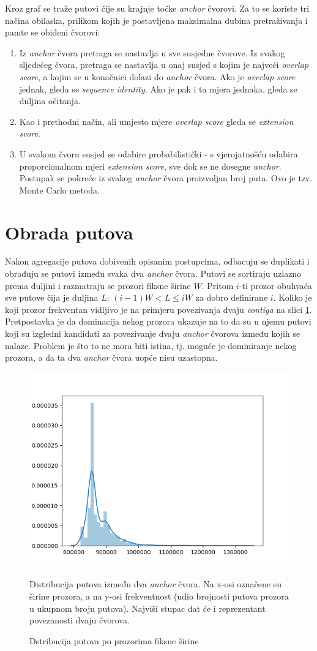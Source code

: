 \documentclass[times, utf8, seminar, numeric]{fer}
\begin{document}
\noindent
Kroz graf se traže putovi čije su krajnje točke \textit{anchor} čvorovi. Za to se koriste tri načina obilaska, prilikom kojih je postavljena maksimalna dubina pretraživanja i pamte se obiđeni čvorovi:
\begin{enumerate}
	\item Iz \textit{anchor} čvora pretraga se nastavlja u sve susjedne čvorove. Iz svakog sljedećeg čvora, pretraga se nastavlja u onaj susjed s kojim je najveći \textit{overlap score}, a kojim se u konačnici dolazi do \textit{anchor} čvora. Ako je \textit{overlap score} jednak, gleda se \textit{sequence identity}. Ako je pak i ta mjera jednaka, gleda se duljina očitanja.
	\item Kao i prethodni način, ali umjesto mjere \textit{overlap score} gleda se \textit{extension score}.
	\item U svakom čvoru susjed se odabire probabilistički - s vjerojatnošću odabira proporcionalnom mjeri \textit{extension score}, sve dok se ne dosegne \textit{anchor}. Postupak se pokreće iz svakog \textit{anchor} čvora proizvoljan broj puta. Ovo je tzv. Monte Carlo metoda.
\end{enumerate}

\section{Obrada putova}
Nakon agregacije putova dobivenih opisanim postupcima, odbacuju se duplikati i obrađuju se putovi između svaka dva \textit{anchor} čvora. Putovi se sortiraju uzlazno prema duljini i razmatraju se prozori fiksne širine $W$. Pritom $i$-ti prozor obuhvaća sve putove čija je duljina $L$: $(i-1)W < L \le iW$ za dobro definirane $i$. Koliko je koji prozor frekventan vidljivo je na primjeru povezivanja dvaju \textit{contiga} na slici \ref{fig:distribution}. Pretpostavka je da dominacija nekog prozora ukazuje na to da su u njemu putovi koji su izgledni kandidati za povezivanje dvaju \textit{anchor} čvorova između kojih se nalaze. Problem je što to ne mora biti istina, tj. moguće je dominiranje nekog prozora, a da ta dva \textit{anchor} čvora uopće nisu uzastopna.

\begin{figure}[h]
	\centering
	\centerline{\includegraphics[width=0.6\linewidth]{img/distribution}}
	\caption{Dstribucija putova po prozorima fiksne širine}
	\label{fig:distribution}
	\small
	Distribucija putova između dva \textit{anchor} čvora. Na x-osi označene su širine prozora, a na y-osi frekventnost (udio brojnosti putova prozora u ukupnom broju putova). Najviši stupac dat će i reprezentant povezanosti dvaju čvorova.
\end{figure}
\end{document}
